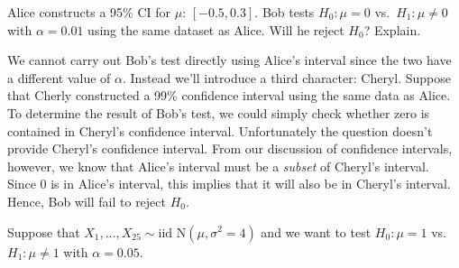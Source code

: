 \documentclass[addpoints,12pt]{exam}
\begin{document}
\begin{questions}
\question Alice constructs a 95\% CI for $\mu$: $[-0.5, 0.3]$. Bob tests $H_0\colon \mu = 0$ vs.\ $H_1\colon \mu\neq 0$ with $\alpha = 0.01$ using the same dataset as Alice. Will he reject $H_0$? Explain.
\begin{solution}
  We cannot carry out Bob's test directly using Alice's interval since the two have a different value of $\alpha$.
  Instead we'll introduce a third character: Cheryl.
  Suppose that Cherly constructed a 99\% confidence interval using the same data as Alice.
  To determine the result of Bob's test, we could simply check whether zero is contained in Cheryl's confidence interval.
  Unfortunately the question doesn't provide Cheryl's confidence interval.
  From our discussion of confidence intervals, however, we know that Alice's interval must be a \emph{subset} of Cheryl's interval.
  Since $0$ is in Alice's interval, this implies that it will also be in Cheryl's interval. 
  Hence, Bob will fail to reject $H_0$.
\end{solution}

\question Suppose that $X_1, \dots, X_{25} \sim \text{iid N}(\mu, \sigma^2 = 4)$ and we want to test $H_0\colon \mu = 1$ vs.\ $H_1\colon \mu \neq 1$ with $\alpha = 0.05$.


\end{questions}
\end{document}
